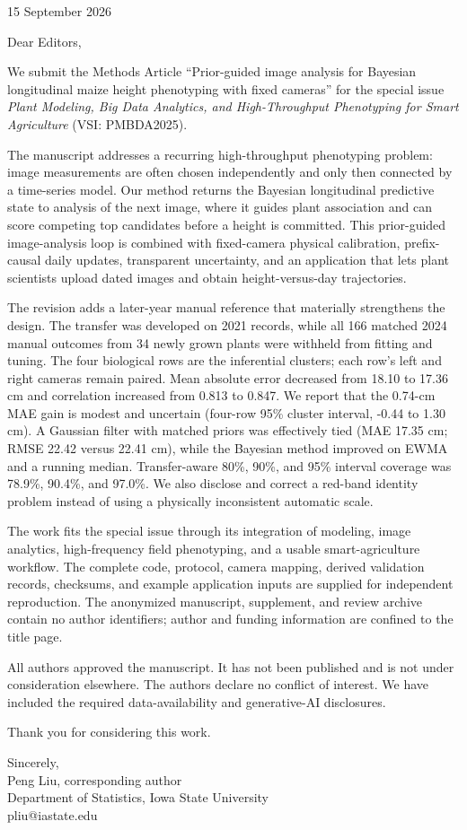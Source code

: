 \documentclass[review,12pt,authoryear]{elsarticle}
\begin{document}
\singlespacing
\begin{flushright}
15 September 2026
\end{flushright}

\noindent Dear Editors,

We submit the Methods Article ``Prior-guided image analysis for Bayesian longitudinal maize height phenotyping with fixed cameras'' for the special issue \emph{Plant Modeling, Big Data Analytics, and High-Throughput Phenotyping for Smart Agriculture} (VSI: PMBDA2025).

The manuscript addresses a recurring high-throughput phenotyping problem: image measurements are often chosen independently and only then connected by a time-series model. Our method returns the Bayesian longitudinal predictive state to analysis of the next image, where it guides plant association and can score competing top candidates before a height is committed. This prior-guided image-analysis loop is combined with fixed-camera physical calibration, prefix-causal daily updates, transparent uncertainty, and an application that lets plant scientists upload dated images and obtain height-versus-day trajectories.

The revision adds a later-year manual reference that materially strengthens the design. The transfer was developed on 2021 records, while all 166 matched 2024 manual outcomes from 34 newly grown plants were withheld from fitting and tuning. The four biological rows are the inferential clusters; each row's left and right cameras remain paired. Mean absolute error decreased from 18.10 to 17.36 cm and correlation increased from 0.813 to 0.847. We report that the 0.74-cm MAE gain is modest and uncertain (four-row 95\% cluster interval, -0.44 to 1.30 cm). A Gaussian filter with matched priors was effectively tied (MAE 17.35 cm; RMSE 22.42 versus 22.41 cm), while the Bayesian method improved on EWMA and a running median. Transfer-aware 80\%, 90\%, and 95\% interval coverage was 78.9\%, 90.4\%, and 97.0\%. We also disclose and correct a red-band identity problem instead of using a physically inconsistent automatic scale.

The work fits the special issue through its integration of modeling, image analytics, high-frequency field phenotyping, and a usable smart-agriculture workflow. The complete code, protocol, camera mapping, derived validation records, checksums, and example application inputs are supplied for independent reproduction. The anonymized manuscript, supplement, and review archive contain no author identifiers; author and funding information are confined to the title page.

All authors approved the manuscript. It has not been published and is not under consideration elsewhere. The authors declare no conflict of interest. We have included the required data-availability and generative-AI disclosures.

Thank you for considering this work.

\vspace{1.5em}
\noindent Sincerely,\\
Peng Liu, corresponding author\\
Department of Statistics, Iowa State University\\
pliu@iastate.edu
\end{document}
